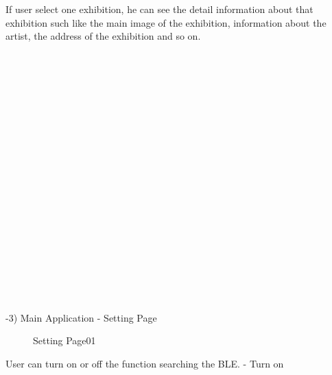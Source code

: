 \documentclass[conference]{IEEEtran}
\begin{document}
If user select one exhibition, he can see the detail information about that exhibition such like the main image of the exhibition, information about the artist, the address of the exhibition and so on. \\\\\\\\\\\\\\\\\\\\\\\\\\\\\\\\\\\\\\\\\\

-3) Main Application - Setting Page
\begin{figure}[htbp]
\begin{center}
    \caption{Setting Page01} 
\end{center}
\end{figure}

User can turn on or off the function searching the BLE. - Turn on\\\\\\\\\\\\\\\\\\\\\\\\\\\\\\\\\\\\\\\\\\\\\\\\
\end{document}
